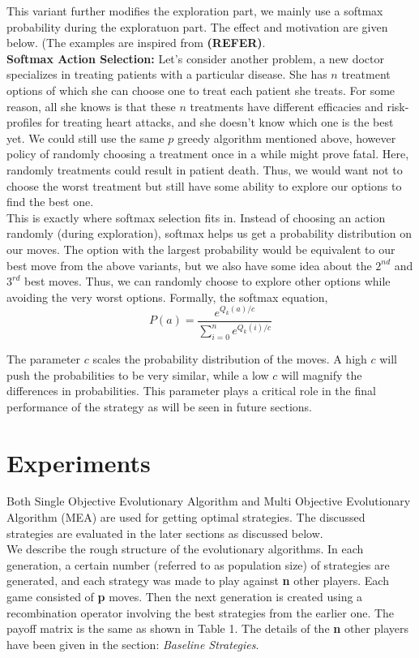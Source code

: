 \documentclass[a4paper]{article}
\begin{document}
	This variant further modifies the exploration part, we mainly use a softmax probability during the exploratuon part. The effect and motivation are given below. (The examples are inspired from \textbf{(REFER)}.\\
	
	\textbf{Softmax Action Selection:} Let's consider another problem, a new doctor specializes in treating patients with a particular disease. She has $n$ treatment options of which she can choose one to treat each patient she treats. For some reason, all she knows is that these $n$ treatments have different efficacies and risk-profiles for treating heart attacks, and she doesn't know which one is the best yet. We could still use the same $p$ greedy algorithm mentioned above, however policy of randomly choosing a treatment once in a while might prove fatal. Here, randomly treatments could result in patient death. Thus, we would want not to choose the worst treatment but still have some ability to explore our options to find the best one.\\
	
	This is exactly where softmax selection fits in. Instead of choosing an action randomly (during exploration), softmax helps us get a probability distribution on our moves. The option with the largest probability would be equivalent to our best move from the above variants, but we also have some idea about the $2^{nd}$ and $3^{rd}$ best moves. Thus, we can randomly choose to explore other options while avoiding the very worst options. Formally, the softmax equation,
\begin{equation}
	P(a) = \frac{e^{Q_{k}(a)/c}}{\sum_{i=0}^{n} {e^{Q_{k}(i)/c}}}
\end{equation} 
	
	The parameter $c$ scales the probability distribution of the moves. A high $c$ will push the probabilities to be very similar, while a low $c$ will magnify the differences in probabilities. This parameter plays a critical role in the final performance of the strategy as will be seen in future sections.
	
	\pagebreak	
	
	\section{Experiments}
	
	Both Single Objective Evolutionary Algorithm and Multi Objective Evolutionary Algorithm (MEA) are used for getting optimal strategies. The discussed strategies are evaluated in the later sections as discussed below.\\
	We describe the rough structure of the evolutionary algorithms. In each generation, a certain number (referred to as population size) of strategies are generated, and each strategy was made to play against \textbf{n} other players. Each game consisted of \textbf{p} moves. Then the next generation is created using a recombination operator involving the best strategies from the earlier one. The payoff matrix is the same as shown in Table 1. The details of the \textbf{n} other players have been given in the section: \textit{Baseline Strategies}.
\end{document}
